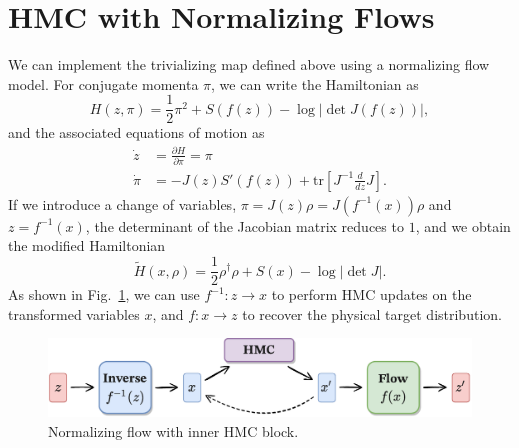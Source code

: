 \documentclass[a4paper,11pt]{article}
\begin{document}
\section{\label{sec:hmc_nf}HMC with Normalizing Flows}
%
We can implement the trivializing map defined above using a normalizing flow
model.
%
For conjugate momenta \(\pi\), we can write the Hamiltonian as
%
\begin{equation}
    H(z, \pi) = \frac{1}{2}\pi^{2} + S(f(z)) - \log\left|\det J(f(z))\right|,
\end{equation}
%
and the associated equations of motion as
%
\begin{align}
    \dot{z} &= \frac{\partial H}{\partial \pi} = \pi \\
    \dot{\pi} &= -J(z) S'(f(z)) + \mathrm{tr}\left[ J^{-1}\frac{d}{dz} J \right].
\end{align}
%
If we introduce a change of variables, \(\pi = J(z)\rho = J(f^{-1}(x))\rho\)
and \(z = f^{-1}(x)\), the determinant of the Jacobian matrix reduces to \(1\),
and we obtain the modified Hamiltonian
%
\begin{equation}
    \tilde{H}(x, \rho) = \frac{1}{2}\rho^{\dagger}\rho + S(x) - \log|\det J|.
\end{equation}
%
As shown in Fig.~\ref{fig:fthmc}, we can use \(f^{-1}: z \rightarrow x\) to perform
HMC updates on the transformed variables \(x\), and \(f: x \rightarrow z\) to
recover the physical target distribution.
%
\begin{figure}[htpb]
    \centering
    \includegraphics[width=\textwidth]{assets/fthmc.pdf}
    \caption{\label{fig:fthmc}Normalizing flow with inner HMC block.}
\end{figure}
%
\end{document}
